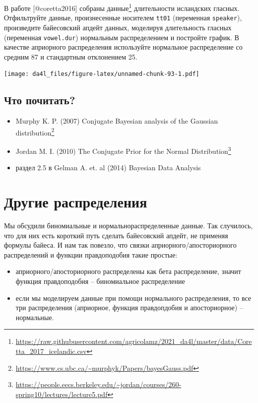 \documentclass[
]{book}
\makeatletter
\providecommand{\tightlist}{%
  \setlength{\itemsep}{0pt}\setlength{\parskip}{0pt}}
\renewcommand{\href}[2]{#2\footnote{\url{#1}}}
\newenvironment{kframe}{%
    \medskip{}
    \setlength{\fboxsep}{.8em}
    \def\at@end@of@kframe{}%
    \ifinner\ifhmode%
    \def\at@end@of@kframe{\end{minipage}}%
    \begin{minipage}{\columnwidth}%
    \fi\fi%
    \def\FrameCommand##1{\hskip\@totalleftmargin \hskip-\fboxsep
    \colorbox{shadecolor}{##1}\hskip-\fboxsep
        \hskip-\linewidth \hskip-\@totalleftmargin \hskip\columnwidth}%
    \MakeFramed {\advance\hsize-\width
      \@totalleftmargin\z@ \linewidth\hsize
      \@setminipage}}%
  {\par\unskip\endMakeFramed%
    \at@end@of@kframe}
\newenvironment{rmdblock}[1]
  {
    \begin{itemize}
    \renewcommand{\labelitemi}{
      \raisebox{-.7\height}[0pt][0pt]{
        {\setkeys{Gin}{width=3em,keepaspectratio}\texttt{[image: images/\#1]}}
        }
        }
        \setlength{\fboxsep}{1em}
        \begin{kframe}
        \item
      }
      {
        \end{kframe}
        \end{itemize}
      }
\newenvironment{rmdtask}
      {\begin{rmdblock}{task}}
      {\end{rmdblock}}
\makeatother
\begin{document}
\begin{rmdtask}
В работе {[}@coretta2016{]} собраны
\href{https://raw.githubusercontent.com/agricolamz/2021_da4l/master/data/Coretta_2017_icelandic.csv}{данные}
длительности исландских гласных. Отфильтруйте данные, произнесенные
носителем \texttt{tt01} (переменная \texttt{speaker}), произведите
байесовский апдейт данных, моделируя длительность гласных (переменная
\texttt{vowel.dur}) нормальным распределением и постройте график. В
качестве априорного распределения используйте нормальное распределение
со средним 87 и стандартным отклонением 25.
\end{rmdtask}

\texttt{[image: da4l\_files/figure-latex/unnamed-chunk-93-1.pdf]}

\hypertarget{ux447ux442ux43e-ux43fux43eux447ux438ux442ux430ux442ux44c-1}{%
\subsection{Что почитать?}\label{ux447ux442ux43e-ux43fux43eux447ux438ux442ux430ux442ux44c-1}}

\begin{itemize}
\tightlist
\item
  \href{https://www.cs.ubc.ca/~murphyk/Papers/bayesGauss.pdf}{Murphy K. P. (2007) Conjugate Bayesian analysis of the Gaussian distribution}
\item
  \href{https://people.eecs.berkeley.edu/~jordan/courses/260-spring10/lectures/lecture5.pdf}{Jordan M. I. (2010) The Conjugate Prior for the Normal Distribution}
\item
  раздел 2.5 в Gelman A. et. al (2014) Bayesian Data Analysis
\end{itemize}

\hypertarget{ux434ux440ux443ux433ux438ux435-ux440ux430ux441ux43fux440ux435ux434ux435ux43bux435ux43dux438ux44f}{%
\section{Другие распределения}\label{ux434ux440ux443ux433ux438ux435-ux440ux430ux441ux43fux440ux435ux434ux435ux43bux435ux43dux438ux44f}}

Мы обсудили биномиальные и нормальнораспределенные данные. Так случилось, что для них есть короткий путь сделать байесовский апдейт, не применяя формулы байеса. И нам так повезло, что связки априорного/апосториорного распределений и функции правдоподобия такие простые:

\begin{itemize}
\tightlist
\item
  априорного/апосториорного распределены как бета распределение, значит функция правдоподобия -- биномиальное распределение
\item
  если мы моделируем данные при помощи нормального распределения, то все три распределения (априорное, функция правдопдобия и апосториорное) -- нормальные.
\end{itemize}
\end{document}
